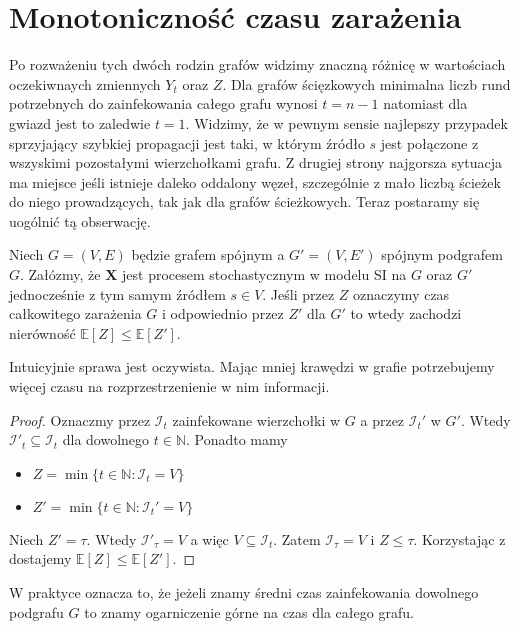 \section{Monotoniczność czasu zarażenia}
Po rozważeniu tych dwóch rodzin grafów widzimy znaczną różnicę w wartościach oczekiwnaych zmiennych $Y_t$ oraz $Z$. Dla grafów ścięzkowych minimalna liczb rund potrzebnych do zainfekowania całego grafu wynosi $t=n-1$ natomiast dla gwiazd jest to zaledwie $t=1$. Widzimy, że w pewnym sensie najlepszy przypadek sprzyjający szybkiej propagacji jest taki, w którym źródło $s$ jest połączone z wszyskimi pozostałymi wierzchołkami grafu. Z drugiej strony najgorsza sytuacja ma miejsce jeśli istnieje daleko oddalony węzeł, szczególnie z mało liczbą ścieżek do niego prowadzących, tak jak dla grafów ścieżkowych. Teraz postaramy się uogólnić tą obserwację. 

\begin{theorem}\label{T:montonicity_of_total_infection}
Niech $G=(V,E)$ będzie grafem spójnym a $G'=(V,E')$ spójnym podgrafem $G$. Załózmy, że $\mathbf{X}$ jest procesem stochastycznym w modelu SI na $G$ oraz $G'$ jednocześnie z tym samym źródłem $s\in V$. Jeśli przez $Z$ oznaczymy czas całkowitego zarażenia $G$ i odpowiednio przez $Z'$ dla $G'$ to wtedy zachodzi nierówność $\mathbb{E}[Z]\le\mathbb{E}[Z']$. 
\end{theorem}

Intuicyjnie sprawa jest oczywista. Mając mniej krawędzi w grafie potrzebujemy więcej czasu na rozprzestrzenienie w nim informacji.

\begin{proof}
Oznaczmy przez $\mathcal{I}_t$ zainfekowane wierzchołki w $G$ a przez $\mathcal{I}_t'$ w $G'$. Wtedy $\mathcal{I}'_t\subseteq\mathcal{I}_t$ dla dowolnego $t\in\mathbb{N}$. Ponadto mamy
\begin{itemize}
    \item $Z = \min\{t\in\mathbb{N} : \mathcal{I}_t=V\}$
    \item $Z' = \min\{t\in\mathbb{N} : \mathcal{I}_t'=V\}$
\end{itemize}     
Niech $Z' = \tau$. Wtedy $\mathcal{I}'_\tau =V$ a więc $V\subseteq \mathcal{I}_t$. Zatem $\mathcal{I}_\tau = V$ i $Z\le \tau$. Korzystając z  dostajemy $\mathbb{E}[Z]\le\mathbb{E}[Z']$.
\end{proof}

W praktyce oznacza to, że jeżeli znamy średni czas zainfekowania dowolnego podgrafu $G$ to znamy ogarniczenie górne na czas dla całego grafu.


